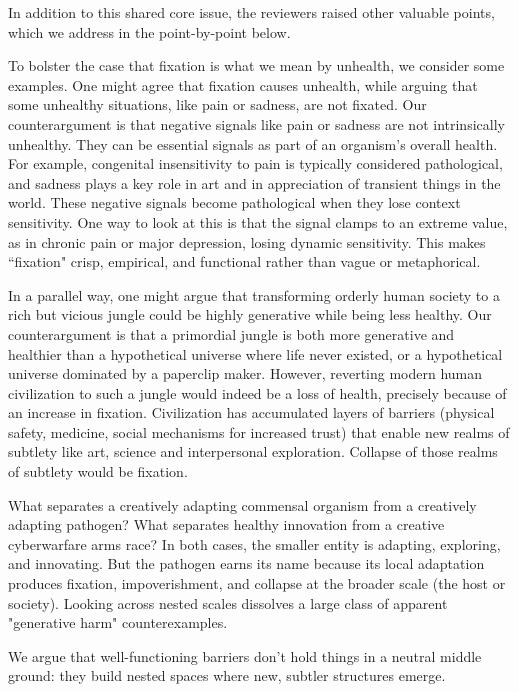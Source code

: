 \documentclass[fontsize=11.5pt]{scrartcl}
\newcounter{point}
\begin{document}
In addition to this shared core issue, the reviewers raised other valuable points, which we address in the point-by-point below.



To bolster the case that fixation is what we mean by unhealth, we consider some examples. One might agree that fixation causes unhealth, while arguing that some unhealthy situations, like pain or sadness, are not fixated. Our counterargument is that negative signals like pain or sadness are not intrinsically unhealthy. They can be essential signals as part of an organism's overall health. For example, congenital insensitivity to pain is typically considered pathological, and sadness plays a key role in art and in appreciation of transient things in the world. These negative signals become pathological when they lose context sensitivity. One way to look at this is that the signal clamps to an extreme value, as in chronic pain or major depression, losing dynamic sensitivity. This makes ``fixation" crisp, empirical, and functional rather than vague or metaphorical.

In a parallel way, one might argue that transforming orderly human society to a rich but vicious jungle could be highly generative while being less healthy. Our counterargument is that a primordial jungle is both more generative and healthier than a hypothetical universe where life never existed, or a hypothetical universe dominated by a paperclip maker. However, reverting modern human civilization to such a jungle would indeed be a loss of health, precisely because of an increase in fixation. Civilization has accumulated layers of barriers (physical safety, medicine, social mechanisms for increased trust) that enable new realms of subtlety like art, science and interpersonal exploration. Collapse of those realms of subtlety would be fixation. 

What separates a creatively adapting commensal organism from a creatively adapting pathogen? What separates healthy innovation from a creative cyberwarfare arms race? In both cases, the smaller entity is adapting, exploring, and innovating. But the pathogen earns its name because its local adaptation produces fixation, impoverishment, and collapse at the broader scale (the host or society). Looking across nested scales dissolves a large class of apparent "generative harm" counterexamples.

We argue that well-functioning barriers don't hold things in a neutral middle ground: they build nested spaces where new, subtler structures emerge. 
\end{document}
